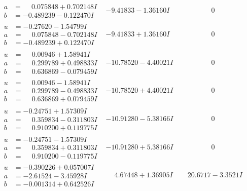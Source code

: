 \documentclass[1p]{elsarticle_modified}
\theoremstyle{definition}
\begin{document}
$$\begin{array}{c|c|c}
\begin{aligned}
a &= \phantom{-}0.075848 + 0.702148 I \\
b &= -0.489239 - 0.122470 I\end{aligned}
 & -9.41833 - 1.36160 I & \phantom{-0.000000 } 0 \\ \hline\begin{aligned}
u &= -0.27620 - 1.54799 I \\
a &= \phantom{-}0.075848 - 0.702148 I \\
b &= -0.489239 + 0.122470 I\end{aligned}
 & -9.41833 + 1.36160 I & \phantom{-0.000000 } 0 \\ \hline\begin{aligned}
u &= \phantom{-}0.00946 + 1.58941 I \\
a &= \phantom{-}0.299789 + 0.498833 I \\
b &= \phantom{-}0.636869 - 0.079459 I\end{aligned}
 & -10.78520 - 4.40021 I & \phantom{-0.000000 } 0 \\ \hline\begin{aligned}
u &= \phantom{-}0.00946 - 1.58941 I \\
a &= \phantom{-}0.299789 - 0.498833 I \\
b &= \phantom{-}0.636869 + 0.079459 I\end{aligned}
 & -10.78520 + 4.40021 I & \phantom{-0.000000 } 0 \\ \hline\begin{aligned}
u &= -0.24751 + 1.57309 I \\
a &= \phantom{-}0.359834 - 0.311803 I \\
b &= \phantom{-}0.910200 + 0.119775 I\end{aligned}
 & -10.91280 - 5.38166 I & \phantom{-0.000000 } 0 \\ \hline\begin{aligned}
u &= -0.24751 - 1.57309 I \\
a &= \phantom{-}0.359834 + 0.311803 I \\
b &= \phantom{-}0.910200 - 0.119775 I\end{aligned}
 & -10.91280 + 5.38166 I & \phantom{-0.000000 } 0 \\ \hline\begin{aligned}
u &= -0.390226 + 0.057007 I \\
a &= -2.61524 - 3.45928 I \\
b &= -0.001314 + 0.642526 I\end{aligned}
 & \phantom{-}4.67448 + 1.36905 I & \phantom{-}20.6717 - 3.3521 I \\ \hline\begin{aligned}

\end{aligned}
\end{array}$$
\end{document}
